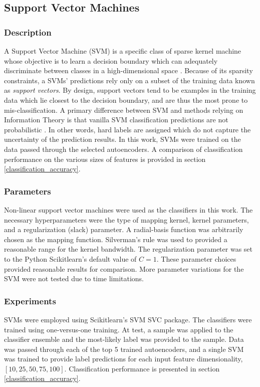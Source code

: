 \documentclass[conference]{IEEEtran}
\begin{document}
	 \subsection{Support Vector Machines}
	 \subsubsection*{Description}
	 A Support Vector Machine (SVM) is a specific class of sparse kernel machine whose objective  is to learn a decision boundary which can adequately discriminate between classes in a high-dimensional space \cite{Lin2011svm,Sanchez2011svm}.  Because of its sparsity constraints, a SVMs' predictions rely only on a subset of the training data known as \textit{support vectors}. By design, support vectors tend to be examples in the training data which lie closest to the decision boundary, and are thus the most prone to mis-classification. A primary difference between SVM and methods relying on Information Theory is that vanilla SVM classification predictions are not probabilistic \cite{Murphy2012Textbook}.  In other words, hard labels are assigned which do not capture the uncertainty of the prediction results.  In this work, SVMs were trained on the data passed through the selected autoencoders.  A comparison of classification performance on the various sizes of features is provided in section \ref{classification_accuracy}.
	 
	 \subsubsection*{Parameters}
	 Non-linear support vector machines were used as the classifiers in this work. The necessary hyperparameters were the type of mapping kernel,  kernel parameters, and a regularization (slack) parameter.  A radial-basis function was arbitrarily chosen as the mapping function.  Silverman's rule was used to provided a reasonable range for the kernel bandwidth. The regularization parameter was set to the Python Scikitlearn's default value of $C=1$.  These parameter choices provided reasonable results for comparison.  More parameter variations for the SVM were not tested due to time limitations.
	 
	 \subsubsection*{Experiments}
	 SVMs were employed using Scikitlearn's SVM SVC package.  The classifiers were trained using one-versus-one training.  At test, a sample was applied to the classifier ensemble and the most-likely label was provided to the sample.  Data was passed through each of the top 5 trained autoencoders, and a single SVM was trained to provide label predictions for each input feature dimensionality, $[10,25,50,75,100]$.  Classification performance is presented in section \ref{classification_accuracy}. 
	 
\end{document}

